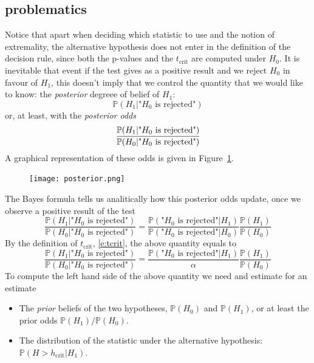 	\subsection{problematics}
		Notice that apart when deciding which statistic to use and the notion of extremality, the alternative hypothesis does not enter in the definition of the decision rule, since both the p-values and the $t_\text{crit}$ are computed under $H_0$. It is inevitable that event if the test gives as a positive result and we reject $H_0$ in favour of $H_1$, this doesn't imply that we control the quantity that  we would like to know: the \emph{posterior} degreee of belief of $H_1$:  
		\begin{equation}
			\label{e:posterior}
			\mathbb P(H_1| \text{"$H_0$ is rejected"})
		\end{equation}
		or, at least, with the \emph{posterior odds }
		\begin{equation}
			\label{e:posterior_odd}
			\frac{\mathbb P(H_1| \text{"$H_0$ is rejected"})}{\mathbb P(H_0| \text{"$ H_0$ is rejected"})}
		\end{equation}
		A graphical representation of these odds is given in Figure~\ref{f:posterior}.
		\begin{figure}[h]
		\texttt{[image: posterior.png]}
		\label{f:posterior}
		\end{figure}
		The Bayes formula tells us analitically how this posterior odds update, once we observe a positive result of the test 
		\begin{equation}
			\label{e:Bayes}
			\frac{\mathbb P(H_1| \text{"$H_0$ is rejected"})}{
				\mathbb P(H_0| \text{"$H_0$ is rejected"})} = 
	\frac{\mathbb P(\text{"$H_0$ is rejected"}|H_1)}{
				\mathbb P( \text{"$H_0$ is rejected"}|H_0)}
			\frac{\mathbb P(H_1)}{\mathbb P(H_0)}
		\end{equation}
	By the definition of $t_\text{crit}$, \eqref{e:tcrit}, the above quantity equals to 
		\begin{equation}
			\label{e:Bayes2}	
			\frac{\mathbb P(H_1| \text{"$H_0$ is rejected"})}{
				\mathbb P(H_0| \text{"$H_0$ is rejected"})} = 
	\frac{\mathbb P(\text{"$H_0$ is rejected"}|H_1)}{
				\alpha}
			\frac{\mathbb P(H_1)}{\mathbb P(H_0)}
		\end{equation}
		To compute the left hand side of the above quantity we need and estimate for  an estimate
		\begin{itemize}
		\item The \emph{ prior } beliefs of the two hypotheses, $\mathbb P(H_0)$ and $\mathbb P(H_1)$, or at least the prior odds $\mathbb P(H_1)/\mathbb P(H_0)$. 
		\item The  distribution of the statistic under the alternative hypothesis: $\mathbb P( H > h_{\text{crit}}| H_1)$. 
	\end{itemize}

